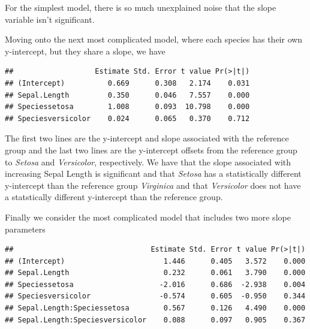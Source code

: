 \documentclass[]{book}
\newenvironment{Shaded}{\begin{snugshade}}{\end{snugshade}}
\newcommand{\KeywordTok}[1]{\textcolor[rgb]{0.13,0.29,0.53}{\textbf{{#1}}}}
\newcommand{\DataTypeTok}[1]{\textcolor[rgb]{0.13,0.29,0.53}{{#1}}}
\newcommand{\DecValTok}[1]{\textcolor[rgb]{0.00,0.00,0.81}{{#1}}}
\newcommand{\StringTok}[1]{\textcolor[rgb]{0.31,0.60,0.02}{{#1}}}
\newcommand{\NormalTok}[1]{{#1}}
\theoremstyle{definition}
\theoremstyle{definition}
\theoremstyle{remark}
\begin{document}
For the simplest model, there is so much unexplained noise that the
slope variable isn't significant.

Moving onto the next most complicated model, where each species has
their own y-intercept, but they share a slope, we have

\begin{Shaded}
\end{Shaded}

\begin{verbatim}
##                   Estimate Std. Error t value Pr(>|t|)
## (Intercept)          0.669      0.308   2.174    0.031
## Sepal.Length         0.350      0.046   7.557    0.000
## Speciessetosa        1.008      0.093  10.798    0.000
## Speciesversicolor    0.024      0.065   0.370    0.712
\end{verbatim}

The first two lines are the y-intercept and slope associated with the
reference group and the last two lines are the y-intercept offsets from
the reference group to \emph{Setosa} and \emph{Versicolor},
respectively. We have that the slope associated with increasing Sepal
Length is significant and that \emph{Setosa} has a statistically
different y-intercept than the reference group \emph{Virginica} and that
\emph{Versicolor} does not have a statstically different y-intercept
than the reference group.

Finally we consider the most complicated model that includes two more
slope parameters

\begin{Shaded}
\end{Shaded}

\begin{verbatim}
##                                Estimate Std. Error t value Pr(>|t|)
## (Intercept)                       1.446      0.405   3.572    0.000
## Sepal.Length                      0.232      0.061   3.790    0.000
## Speciessetosa                    -2.016      0.686  -2.938    0.004
## Speciesversicolor                -0.574      0.605  -0.950    0.344
## Sepal.Length:Speciessetosa        0.567      0.126   4.490    0.000
## Sepal.Length:Speciesversicolor    0.088      0.097   0.905    0.367
\end{verbatim}
\end{document}
